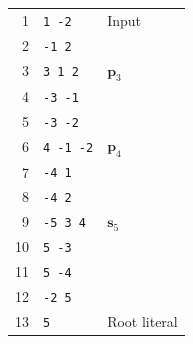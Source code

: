 \documentclass[t,pdf]{beamer}
\newcommand{\makenode}[1]{{\mathbf #1}}
\newcommand{\nodes}{\makenode{s}}
\newcommand{\nodep}{\makenode{p}}
\newcommand{\rtext}[1]{\textcolor{xred}{#1}}
\newcommand{\gtext}[1]{\textcolor{xgreen}{#1}}
\begin{document}
\begin{frame}
\begin{minipage}{0.58\textwidth}
\end{minipage}
\begin{minipage}{0.4\textwidth}
\begin{tabular}{rll}
\midrule
  \rtext{1} & \gtext{\texttt{1 -2}} &  Input \\
  \rtext{2} & \gtext{\texttt{-1 2}} &   \\
\midrule
  \rtext{3} & \gtext{\texttt{3 1 2}} &  $\nodep_3$ \\
  \rtext{4} & \gtext{\texttt{-3 -1}} &   \\
  \rtext{5} & \gtext{\texttt{-3 -2}} &   \\
  \midrule
  \rtext{6} & \gtext{\texttt{4 -1 -2}} &  $\nodep_4$ \\
  \rtext{7} & \gtext{\texttt{-4 1}} &   \\
  \rtext{8} & \gtext{\texttt{-4 2}} &   \\
  \midrule
  \rtext{9} & \gtext{\texttt{-5 3 4}} &  $\nodes_5$ \\
  \rtext{10} & \gtext{\texttt{5 -3}} &   \\
  \rtext{11} & \gtext{\texttt{5 -4}} &   \\
\midrule
  \rtext{12} & \gtext{\texttt{-2 5}} &    \\
  \rtext{13} & \gtext{\texttt{5}} &   Root literal \\
\bottomrule
\end{tabular}
\end{minipage}
\end{frame}
\end{document}
